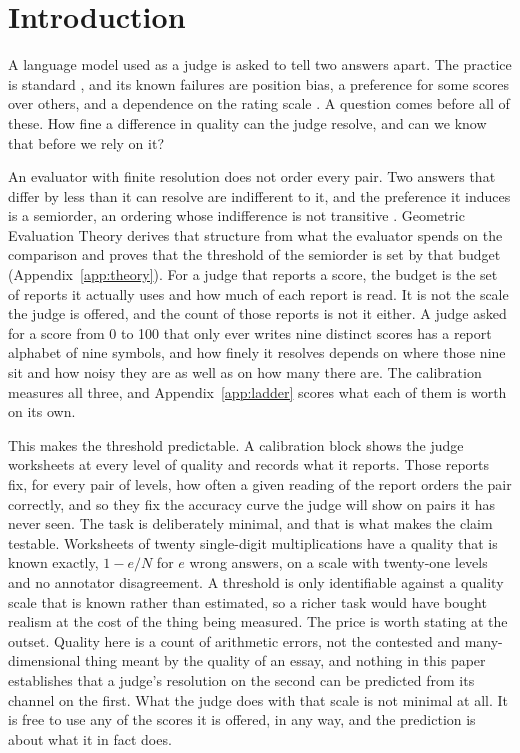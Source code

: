 \documentclass{article}
\theoremstyle{definition}
\theoremstyle{remark}
\begin{document}
\section{Introduction}

A language model used as a judge is asked to tell two answers apart.
The practice is standard \citep{zheng2023}, and its known failures are position bias, a preference for some scores over others, and a dependence on the rating scale \citep{li2026grading}.
A question comes before all of these.
How fine a difference in quality can the judge resolve, and can we know that before we rely on it?

An evaluator with finite resolution does not order every pair.
Two answers that differ by less than it can resolve are indifferent to it, and the preference it induces is a semiorder, an ordering whose indifference is not transitive \citep{luce1956}.
Geometric Evaluation Theory derives that structure from what the evaluator spends on the comparison and proves that the threshold of the semiorder is set by that budget (Appendix~\ref{app:theory}).
For a judge that reports a score, the budget is the set of reports it actually uses and how much of each report is read.
It is not the scale the judge is offered, and the count of those reports is not it either.
A judge asked for a score from 0 to 100 that only ever writes nine distinct scores has a report alphabet of nine symbols, and how finely it resolves depends on where those nine sit and how noisy they are as well as on how many there are. The calibration measures all three, and Appendix~\ref{app:ladder} scores what each of them is worth on its own.

This makes the threshold predictable.
A calibration block shows the judge worksheets at every level of quality and records what it reports.
Those reports fix, for every pair of levels, how often a given reading of the report orders the pair correctly, and so they fix the accuracy curve the judge will show on pairs it has never seen.
The task is deliberately minimal, and that is what makes the claim testable.
Worksheets of twenty single-digit multiplications have a quality that is known exactly, $1-e/N$ for $e$ wrong answers, on a scale with twenty-one levels and no annotator disagreement.
A threshold is only identifiable against a quality scale that is known rather than estimated, so a richer task would have bought realism at the cost of the thing being measured.
The price is worth stating at the outset. Quality here is a count of arithmetic errors, not the contested and many-dimensional thing meant by the quality of an essay, and nothing in this paper establishes that a judge's resolution on the second can be predicted from its channel on the first.
What the judge does with that scale is not minimal at all. It is free to use any of the scores it is offered, in any way, and the prediction is about what it in fact does.
\end{document}
